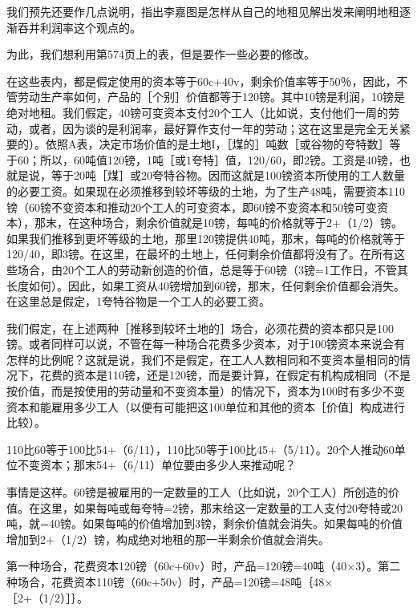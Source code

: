
我们预先还要作几点说明，指出李嘉图是怎样从自己的地租见解出发来阐明地租逐渐吞并利润率这个观点的。

为此，我们想利用第574页上的表，但是要作一些必要的修改。

在这些表内，都是假定使用的资本等于60c+40v，剩余价值率等于50％，因此，不管劳动生产率如何，产品的［个别］价值都等于120镑。其中10镑是利润，10镑是绝对地租。我们假定，40镑可变资本支付20个工人（比如说，支付他们一周的劳动，或者，因为谈的是利润率，最好算作支付一年的劳动；这在这里是完全无关紧要的）。依照A表，决定市场价值的是土地I，［煤的］吨数［或谷物的夸特数］等于60；所以，60吨值120镑，1吨［或1夸特］值，120/60，即2镑。工资是40镑，也就是说，等于20吨［煤］或20夸特谷物。因而这就是100镑资本所使用的工人数量的必要工资。如果现在必须推移到较坏等级的土地，为了生产48吨，需要资本110镑（60镑不变资本和推动20个工人的可变资本，即60镑不变资本和50镑可变资本），那末，在这种场合，剩余价值就是10镑，每吨的价格就等于2+（1/2）镑。如果我们推移到更坏等级的土地，那里120镑提供40吨，那末，每吨的价格就等于120/40，即3镑。在这里，在最坏的土地上，任何剩余价值都将没有了。在所有这些场合，由20个工人的劳动新创造的价值，总是等于60镑（3镑=1工作日，不管其长度如何）。因此，如果工资从40镑增加到60镑，那末，任何剩余价值都会消失。在这里总是假定，1夸特谷物是一个工人的必要工资。

我们假定，在上述两种［推移到较坏土地的］场合，必须花费的资本都只是100镑。或者同样可以说，不管在每一种场合花费多少资本，对于100镑资本来说会有怎样的比例呢？这就是说，我们不是假定，在工人人数相同和不变资本量相同的情况下，花费的资本是110镑，还是120镑，而是要计算，在假定有机构成相同（不是按价值，而是按使用的劳动量和不变资本量）的情况下，资本为100时有多少不变资本和能雇用多少工人（以便有可能把这100单位和其他的资本［价值］构成进行比较）。

110比60等于100比54+（6/11），110比50等于100比45+（5/11）。20个人推动60单位不变资本；那末54+（6/11）单位要由多少人来推动呢？

事情是这样。60镑是被雇用的一定数量的工人（比如说，20个工人）所创造的价值。在这里，如果每吨或每夸特=2镑，那末给这一定数量的工人支付20夸特或20吨，就=40镑。如果每吨的价值增加到3镑，剩余价值就会消失。如果每吨的价值增加到2+（1/2）镑，构成绝对地租的那一半剩余价值就会消失。

第一种场合，花费资本120镑（60c+60v）时，产品=120镑=40吨（40×3）。第二种场合，花费资本110镑（60c+50v）时，产品=120镑=48吨｛48×［2+（1/2）］｝。

